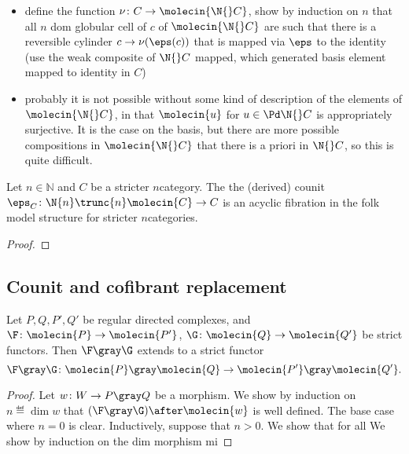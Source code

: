 \begin{itemize}
    \item define the function \( \nu \colon C \to \molecin{\N{}C} \), show by induction on \( n \) that all \( n \) dom globular cell of \( c \) of \( \molecin{\N{} C} \) are such that there is a reversible cylinder \( c \to \nu(\eps(c)) \) that is mapped via \( \eps \) to the identity (use the weak composite of \( \N{} C \) mapped, which generated basis element mapped to identity in \( C \))
    \item probably it is not possible without some kind of description of the elements of \( \molecin{\N{}C} \), in that \( \molecin{u} \) for \( u \in \Pd \N{} C \) is appropriately surjective. It is the case on the basis, but there are more possible compositions in \( \molecin{\N{}C} \) that there is a priori in \( \N{} C \), so this is quite difficult.
\end{itemize}


\begin{thm} \label{thm:cofibrant_replacement_counit_n}
    Let \( n \in \mathbb{N} \) and \( C \) be a stricter \( n \)\nbd category. 
    The the (derived) counit \( \eps_C \colon \N{n}\trunc{n}\molecin{C} \to C \) is an acyclic fibration in the folk model structure for stricter \( n \)\nbd categories.
\end{thm}
\begin{proof}
\end{proof}

\subsection{Counit and cofibrant replacement}



\begin{lem} \label{lem:gray_determines_strict_functors}
    Let \( P, Q, P', Q' \) be regular directed complexes, and \( \F \colon \molecin{P} \to \molecin{P'} \), \( \G \colon \molecin{Q} \to \molecin{Q'} \) be strict functors.
    Then \( \F \gray \G \) extends to a strict functor 
    \begin{equation*}
        \F \gray \G \colon \molecin{P} \gray \molecin{Q} \to \molecin{P'} \gray \molecin{Q'}.
    \end{equation*}
\end{lem}
\begin{proof}
    Let \( w \colon W \to P \gray Q \) be a morphism.
    We show by induction on \( n \eqdef \dim w \) that \( (\F \gray \G) \after \molecin{w} \) is well defined. 
    The base case where \( n = 0 \) is clear.
    Inductively, suppose that \( n > 0 \).
    We show that for all 
    We show by induction on the dim morphism mi
\end{proof}


